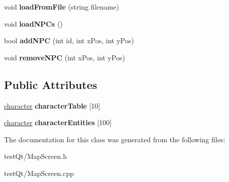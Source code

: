 \begin{DoxyCompactItemize}
\hypertarget{class_map_screen_a7c3d724b7df47905c2b6310fa5ea894d}{}\label{class_map_screen_a7c3d724b7df47905c2b6310fa5ea894d} 
void {\bfseries load\+From\+File} (string filename)
\item 
\hypertarget{class_map_screen_a6314d018f5cd93f6a7c5cca2c96cd9c0}{}\label{class_map_screen_a6314d018f5cd93f6a7c5cca2c96cd9c0} 
void {\bfseries load\+N\+P\+Cs} ()
\item 
\hypertarget{class_map_screen_a9319425b52da0c0c1860fdf123724fa5}{}\label{class_map_screen_a9319425b52da0c0c1860fdf123724fa5} 
bool {\bfseries add\+N\+PC} (int id, int x\+Pos, int y\+Pos)
\item 
\hypertarget{class_map_screen_a47a88c4b46017ac1754f6208516e4c24}{}\label{class_map_screen_a47a88c4b46017ac1754f6208516e4c24} 
void {\bfseries remove\+N\+PC} (int x\+Pos, int y\+Pos)
\end{DoxyCompactItemize}
\subsection*{Public Attributes}
\begin{DoxyCompactItemize}
\item 
\hypertarget{class_map_screen_af3db400915544bc7a680711ee16a46f7}{}\label{class_map_screen_af3db400915544bc7a680711ee16a46f7} 
\hyperlink{classcharacter}{character} {\bfseries character\+Table} \mbox{[}10\mbox{]}
\item 
\hypertarget{class_map_screen_aba782e08ff8c1d02476b0a9e22cc1445}{}\label{class_map_screen_aba782e08ff8c1d02476b0a9e22cc1445} 
\hyperlink{classcharacter}{character} {\bfseries character\+Entities} \mbox{[}100\mbox{]}
\end{DoxyCompactItemize}


The documentation for this class was generated from the following files\+:\begin{DoxyCompactItemize}
\item 
test\+Qt/Map\+Screen.\+h\item 
test\+Qt/Map\+Screen.\+cpp\end{DoxyCompactItemize}

